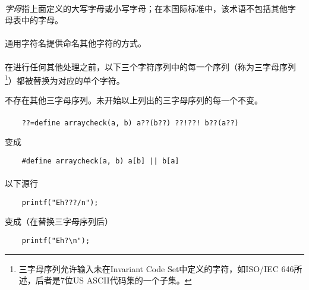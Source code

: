 \paragraph{}
\textit{字母}指上面定义的大写字母或小写字母；在本国际标准中，该术语不包括其他字
母表中的字母。

\paragraph{}
通用字符名提供命名其他字符的方式。


\paragraph{}
在进行任何其他处理之前，以下三个字符序列中的每一个序列（称为三字母序列
\footnote{三字母序列允许输入未在Invariant Code Set中定义的字符，如ISO/IEC 646所
述，后者是$7$位US ASCII代码集的一个子集。}）都被替换为对应的单个字符。

\mbox{\qquad\tm{??=\quad\#\qquad\qquad??)\quad]\qquad\qquad??!\quad|}}

\mbox{\qquad\tm{??(\quad[\qquad\qquad??\sq\quad\^\qquad\qquad??>\quad\}}}

\mbox{\qquad{}}

不存在其他三字母序列。未开始以上列出的三字母序列的每一个不变。

\paragraph{}
\ex
\begin{lstlisting}
    ??=define arraycheck(a, b) a??(b??) ??!??! b??(a??)
\end{lstlisting}
变成
\begin{lstlisting}
    #define arraycheck(a, b) a[b] || b[a]
\end{lstlisting}

\paragraph{}
\ex 以下源行
\begin{lstlisting}
    printf("Eh???/n");
\end{lstlisting}
变成（在替换三字母序列后）
\begin{lstlisting}
    printf("Eh?\n");
\end{lstlisting}

